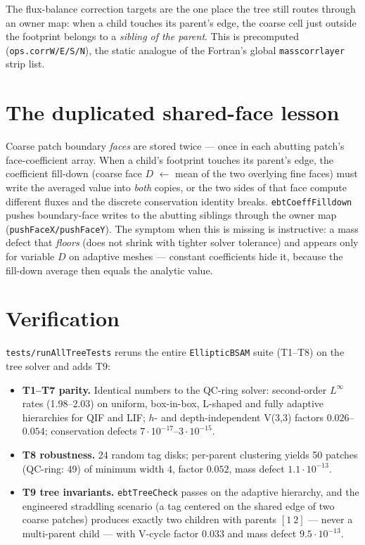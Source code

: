 \documentclass[11pt,oneside,openany]{book}
\newcommand{\code}[1]{\textnormal{\texttt{#1}}}
\begin{document}
The flux-balance correction targets are the one place the tree still
routes through an owner map: when a child touches its parent's edge,
the coarse cell just outside the footprint belongs to a \emph{sibling
of the parent}.  This is precomputed (\code{ops.corrW/E/S/N}), the
static analogue of the Fortran's global \code{masscorrlayer} strip
list.

\section{The duplicated shared-face lesson}
\label{sec:sharedface}

\begin{cautionbox}
Coarse patch boundary \emph{faces} are stored twice --- once in each
abutting patch's face-coefficient array.  When a child's footprint
touches its parent's edge, the coefficient fill-down (coarse face $D$
$\leftarrow$ mean of the two overlying fine faces) must write the
averaged value into \emph{both} copies, or the two sides of that face
compute different fluxes and the discrete conservation identity breaks.
\code{ebtCoeffFilldown} pushes boundary-face writes to the abutting
siblings through the owner map (\code{pushFaceX/pushFaceY}).  The
symptom when this is missing is instructive: a mass defect that
\emph{floors} (does not shrink with tighter solver tolerance) and
appears only for variable $D$ on adaptive meshes --- constant
coefficients hide it, because the fill-down average then equals the
analytic value.
\end{cautionbox}

\section{Verification}
\label{sec:ebtverify}

\code{tests/runAllTreeTests} reruns the entire \code{EllipticBSAM}
suite (T1--T8) on the tree solver and adds T9:

\begin{itemize}[leftmargin=2em]
\item \textbf{T1--T7 parity.}  Identical numbers to the QC-ring solver:
second-order $L^\infty$ rates (1.98--2.03) on uniform, box-in-box,
L-shaped and fully adaptive hierarchies for QIF and LIF;
$h$- and depth-independent V(3,3) factors $0.026$--$0.054$;
conservation defects $7\cdot 10^{-17}$--$3\cdot 10^{-15}$.
\item \textbf{T8 robustness.}  24 random tag disks; per-parent
clustering yields 50 patches (QC-ring: 49) of minimum width 4, factor
$0.052$, mass defect $1.1\cdot 10^{-13}$.
\item \textbf{T9 tree invariants.}  \code{ebtTreeCheck} passes on the
adaptive hierarchy, and the engineered straddling scenario (a tag
centered on the shared edge of two coarse patches) produces exactly two
children with parents $[1\ 2]$ --- never a multi-parent child --- with
V-cycle factor $0.033$ and mass defect $9.5\cdot 10^{-13}$.
\end{itemize}
\end{document}

